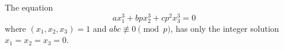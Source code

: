 \begin{proposition}
    The equation
\[
    ax_1^3+bpx_2^3+cp^2x_3^3=0
\]
    where $(x_1,x_2,x_3)=1$ and $abc\not\equiv0\pmod p$, has only the integer solution $x_1=x_2=x_3=0$.
\end{proposition}
